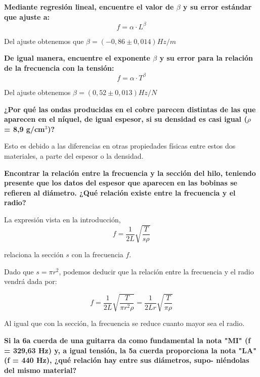 \documentclass[a4paper,12pt,spanish]{article}
\begin{document}
\textbf{Mediante regresión lineal, encuentre el valor de $\beta$ y su error estándar que ajuste a:}
\[ f = \alpha \cdot L^\beta \]

Del ajuste obtenemos que $\beta= (-0,86 \pm 0,014) \si{Hz/m}$



	\vspace{\baselineskip}
\textbf{De igual manera, encuentre el exponente $\beta$ y su error para la relación de la frecuencia con la tensión:}
\[ f = \alpha \cdot T^\beta \]

Del ajuste obtenemos $\beta = (0,52 \pm 0,013) \si{Hz/N}$



	\vspace{\baselineskip}
\textbf{¿Por qué las ondas producidas en el cobre parecen distintas de las que aparecen en el níquel, de igual espesor, si su densidad es casi igual ($\rho$ = 8,9 g/cm$^3$)?}
	\vspace{\baselineskip}

Esto es debido a las diferencias en otras propiedades físicas entre estos dos materiales, a parte del espesor o la densidad.


	\vspace{\baselineskip}
\textbf{
	Encontrar la relación entre la frecuencia y la sección del hilo, teniendo presente que los datos del espesor que aparecen en las bobinas se refieren al diámetro. ¿Qué relación existe entre la frecuencia y el radio?
}

La expresión vista en la introducción, 
\[f = \frac{1}{2L}\sqrt{\frac{T}{s\rho}}\]

relaciona la sección $s$ con la frecuencia $f$.

Dado que $s= \pi r^2$, podemos deducir que la relación entre la frecuencia y el radio vendrá dada por:

\[f= \frac{1}{2L}\sqrt{\frac{T}{\pi r^2\rho}}=\frac{1}{2Lr}\sqrt{\frac{T}{\pi \rho}} \]

Al igual que con la sección, la frecuencia se reduce cuanto mayor sea el radio.

	\vspace{\baselineskip}
\textbf{
Si la 6a cuerda de una guitarra da como fundamental la nota "MI" (f = 329,63 Hz) y, a igual tensión, la 5a cuerda proporciona la nota
"LA" (f = 440 Hz), ¿qué relación hay entre sus diámetros, supo-
niéndolas del mismo material?
}
\vspace{\baselineskip}
\end{document}
